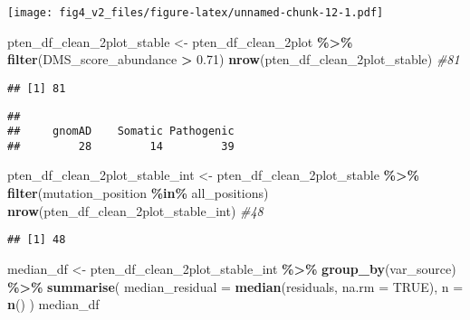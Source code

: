 \documentclass[
]{article}
\newenvironment{Shaded}{\begin{snugshade}}{\end{snugshade}}
\newcommand{\AttributeTok}[1]{\textcolor[rgb]{0.13,0.29,0.53}{#1}}
\newcommand{\CommentTok}[1]{\textcolor[rgb]{0.56,0.35,0.01}{\textit{#1}}}
\newcommand{\ConstantTok}[1]{\textcolor[rgb]{0.56,0.35,0.01}{#1}}
\newcommand{\FloatTok}[1]{\textcolor[rgb]{0.00,0.00,0.81}{#1}}
\newcommand{\FunctionTok}[1]{\textcolor[rgb]{0.13,0.29,0.53}{\textbf{#1}}}
\newcommand{\NormalTok}[1]{#1}
\newcommand{\OtherTok}[1]{\textcolor[rgb]{0.56,0.35,0.01}{#1}}
\newcommand{\SpecialCharTok}[1]{\textcolor[rgb]{0.81,0.36,0.00}{\textbf{#1}}}
\begin{document}
\texttt{[image: fig4\_v2\_files/figure-latex/unnamed-chunk-12-1.pdf]}

\begin{Shaded}
\begin{Highlighting}[]
\NormalTok{pten\_df\_clean\_2plot\_stable }\OtherTok{\textless{}{-}}\NormalTok{ pten\_df\_clean\_2plot }\SpecialCharTok{\%\textgreater{}\%} \FunctionTok{filter}\NormalTok{(DMS\_score\_abundance }\SpecialCharTok{\textgreater{}} \FloatTok{0.71}\NormalTok{)}
\FunctionTok{nrow}\NormalTok{(pten\_df\_clean\_2plot\_stable) }\CommentTok{\#81}
\end{Highlighting}
\end{Shaded}

\begin{verbatim}
## [1] 81
\end{verbatim}

\begin{Shaded}
\end{Shaded}

\begin{verbatim}
## 
##     gnomAD    Somatic Pathogenic 
##         28         14         39
\end{verbatim}

\begin{Shaded}
\begin{Highlighting}[]
\NormalTok{pten\_df\_clean\_2plot\_stable\_int }\OtherTok{\textless{}{-}}\NormalTok{ pten\_df\_clean\_2plot\_stable }\SpecialCharTok{\%\textgreater{}\%} \FunctionTok{filter}\NormalTok{(mutation\_position }\SpecialCharTok{\%in\%}\NormalTok{ all\_positions)}
\FunctionTok{nrow}\NormalTok{(pten\_df\_clean\_2plot\_stable\_int) }\CommentTok{\#48}
\end{Highlighting}
\end{Shaded}

\begin{verbatim}
## [1] 48
\end{verbatim}

\begin{Shaded}
\begin{Highlighting}[]
\NormalTok{median\_df }\OtherTok{\textless{}{-}}\NormalTok{ pten\_df\_clean\_2plot\_stable\_int }\SpecialCharTok{\%\textgreater{}\%}
  \FunctionTok{group\_by}\NormalTok{(var\_source) }\SpecialCharTok{\%\textgreater{}\%}
  \FunctionTok{summarise}\NormalTok{(}
    \AttributeTok{median\_residual =} \FunctionTok{median}\NormalTok{(residuals, }\AttributeTok{na.rm =} \ConstantTok{TRUE}\NormalTok{),}
    \AttributeTok{n =} \FunctionTok{n}\NormalTok{()}
\NormalTok{  )}
\NormalTok{median\_df}
\end{Highlighting}
\end{Shaded}
\end{document}
